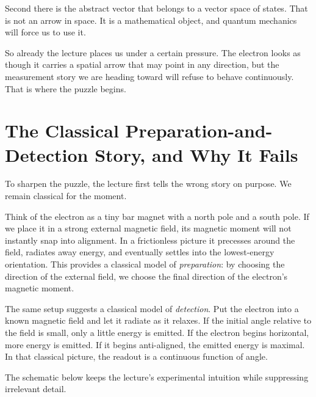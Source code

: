 Second there is the abstract vector that belongs to a vector space of states. That is not an arrow in space. It is a mathematical object, and quantum mechanics will force us to use it.

So already the lecture places us under a certain pressure. The electron looks as though it carries a spatial arrow that may point in any direction, but the measurement story we are heading toward will refuse to behave continuously. That is where the puzzle begins.

\section{The Classical Preparation-and-Detection Story, and Why It Fails}

To sharpen the puzzle, the lecture first tells the wrong story on purpose. We remain classical for the moment.

Think of the electron as a tiny bar magnet with a north pole and a south pole. If we place it in a strong external magnetic field, its magnetic moment will not instantly snap into alignment. In a frictionless picture it precesses around the field, radiates away energy, and eventually settles into the lowest-energy orientation. This provides a classical model of \emph{preparation}: by choosing the direction of the external field, we choose the final direction of the electron's magnetic moment.

The same setup suggests a classical model of \emph{detection}. Put the electron into a known magnetic field and let it radiate as it relaxes. If the initial angle relative to the field is small, only a little energy is emitted. If the electron begins horizontal, more energy is emitted. If it begins anti-aligned, the emitted energy is maximal. In that classical picture, the readout is a continuous function of angle.

The schematic below keeps the lecture's experimental intuition while suppressing irrelevant detail.

\begin{figure}[h]
\centering
{}
\end{figure}

